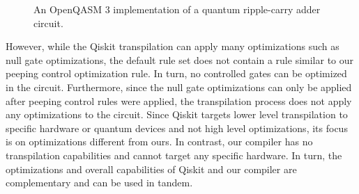 \begin{figure}[htp]
    \centering     
    
    \caption{An OpenQASM 3 implementation of a quantum ripple-carry adder circuit.}
    \label{fig:eval_adder_qasm}
\end{figure}

However, while the Qiskit transpilation can apply many optimizations such as null gate optimizations, the default rule set does not contain a rule similar to our peeping control optimization rule. In turn, no controlled gates can be optimized in the circuit. Furthermore, since the null gate optimizations can only be applied after peeping control rules were applied, the transpilation process does not apply any optimizations to the circuit. Since Qiskit targets lower level transpilation to specific hardware or quantum devices and not high level optimizations, its focus is on optimizations different from ours. In contrast, our compiler has no transpilation capabilities and cannot target any specific hardware. In turn, the optimizations and overall capabilities of Qiskit and our compiler are complementary and can be used in tandem.
